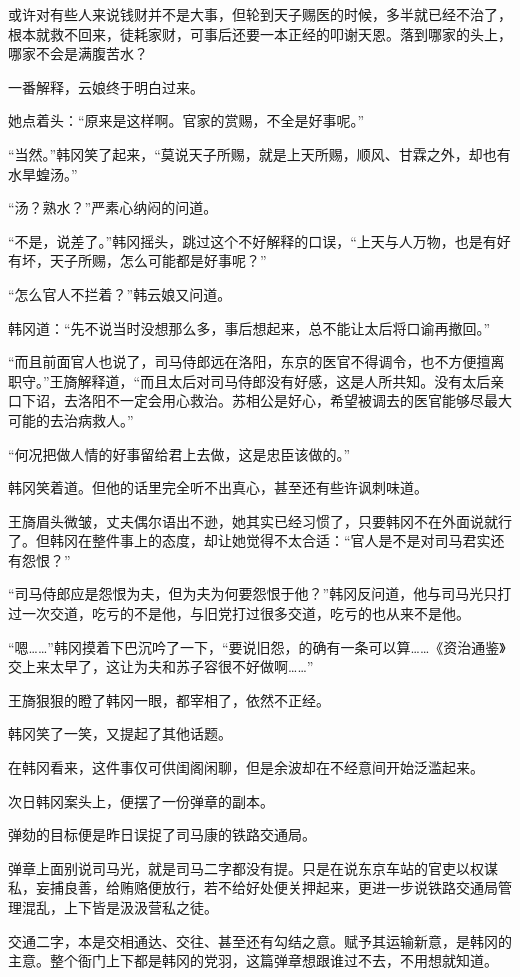 或许对有些人来说钱财并不是大事，但轮到天子赐医的时候，多半就已经不治了，根本就救不回来，徒耗家财，可事后还要一本正经的叩谢天恩。落到哪家的头上，哪家不会是满腹苦水？

一番解释，云娘终于明白过来。

她点着头：“原来是这样啊。官家的赏赐，不全是好事呢。”

“当然。”韩冈笑了起来，“莫说天子所赐，就是上天所赐，顺风、甘霖之外，却也有水旱蝗汤。”

“汤？熟水？”严素心纳闷的问道。

“不是，说差了。”韩冈摇头，跳过这个不好解释的口误，“上天与人万物，也是有好有坏，天子所赐，怎么可能都是好事呢？”

“怎么官人不拦着？”韩云娘又问道。

韩冈道：“先不说当时没想那么多，事后想起来，总不能让太后将口谕再撤回。”

“而且前面官人也说了，司马侍郎远在洛阳，东京的医官不得调令，也不方便擅离职守。”王旖解释道，“而且太后对司马侍郎没有好感，这是人所共知。没有太后亲口下诏，去洛阳不一定会用心救治。苏相公是好心，希望被调去的医官能够尽最大可能的去治病救人。”

“何况把做人情的好事留给君上去做，这是忠臣该做的。”

韩冈笑着道。但他的话里完全听不出真心，甚至还有些许讽刺味道。

王旖眉头微皱，丈夫偶尔语出不逊，她其实已经习惯了，只要韩冈不在外面说就行了。但韩冈在整件事上的态度，却让她觉得不太合适：“官人是不是对司马君实还有怨恨？”

“司马侍郎应是怨恨为夫，但为夫为何要怨恨于他？”韩冈反问道，他与司马光只打过一次交道，吃亏的不是他，与旧党打过很多交道，吃亏的也从来不是他。

“嗯……”韩冈摸着下巴沉吟了一下，“要说旧怨，的确有一条可以算……《资治通鉴》交上来太早了，这让为夫和苏子容很不好做啊……”

王旖狠狠的瞪了韩冈一眼，都宰相了，依然不正经。

韩冈笑了一笑，又提起了其他话题。

在韩冈看来，这件事仅可供闺阁闲聊，但是余波却在不经意间开始泛滥起来。

次日韩冈案头上，便摆了一份弹章的副本。

弹劾的目标便是昨日误捉了司马康的铁路交通局。

弹章上面别说司马光，就是司马二字都没有提。只是在说东京车站的官吏以权谋私，妄捕良善，给贿赂便放行，若不给好处便关押起来，更进一步说铁路交通局管理混乱，上下皆是汲汲营私之徒。

交通二字，本是交相通达、交往、甚至还有勾结之意。赋予其运输新意，是韩冈的主意。整个衙门上下都是韩冈的党羽，这篇弹章想跟谁过不去，不用想就知道。

